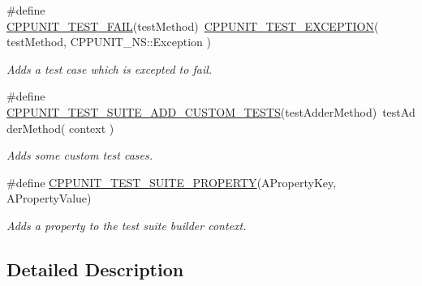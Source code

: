 \begin{DoxyCompactItemize}
\#define \hyperlink{group___writing_test_fixture_ga5bdaf0444216a8f93ead13d5ae964d7e}{C\+P\+P\+U\+N\+I\+T\+\_\+\+T\+E\+S\+T\+\_\+\+F\+A\+I\+L}(test\+Method)~\hyperlink{group___writing_test_fixture_gaca8eeb6f60714baade6cbfd185868c40}{C\+P\+P\+U\+N\+I\+T\+\_\+\+T\+E\+S\+T\+\_\+\+E\+X\+C\+E\+P\+T\+I\+O\+N}( test\+Method, C\+P\+P\+U\+N\+I\+T\+\_\+\+N\+S\+::\+Exception )
\begin{DoxyCompactList}\small\item\em Adds a test case which is excepted to fail. \end{DoxyCompactList}\item 
\#define \hyperlink{group___writing_test_fixture_ga516fec19cd7a7acb6fbf194bd98c4c09}{C\+P\+P\+U\+N\+I\+T\+\_\+\+T\+E\+S\+T\+\_\+\+S\+U\+I\+T\+E\+\_\+\+A\+D\+D\+\_\+\+C\+U\+S\+T\+O\+M\+\_\+\+T\+E\+S\+T\+S}(test\+Adder\+Method)~test\+Adder\+Method( context )
\begin{DoxyCompactList}\small\item\em Adds some custom test cases. \end{DoxyCompactList}\item 
\#define \hyperlink{group___writing_test_fixture_gac5ac4d8544ac2648a28bf7e4dcb27b9d}{C\+P\+P\+U\+N\+I\+T\+\_\+\+T\+E\+S\+T\+\_\+\+S\+U\+I\+T\+E\+\_\+\+P\+R\+O\+P\+E\+R\+T\+Y}(A\+Property\+Key, A\+Property\+Value)
\begin{DoxyCompactList}\small\item\em Adds a property to the test suite builder context. \end{DoxyCompactList}\end{DoxyCompactItemize}


\subsection{Detailed Description}



